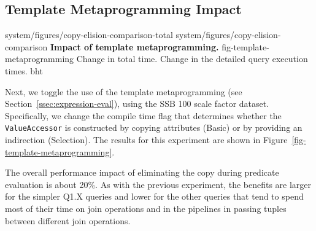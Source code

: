 


\subsection{Template Metaprogramming Impact}
\label{sec:expt:vectorization}

\twoabfigures
{system/figures/copy-elision-comparison-total}
{system/figures/copy-elision-comparison}
{\textbf{Impact of template metaprogramming.}}
{fig-template-metaprogramming}
{Change in total time.}
{Change in the detailed query execution times.}
{bht}

Next, we toggle the use of the template metaprogramming (see Section~\ref{ssec:expression-eval}), using the SSB 100 scale factor dataset. Specifically, we change the compile time flag that determines whether the \texttt{ValueAccessor} is constructed by copying attributes (Basic) or by providing an indirection (Selection). The results for this experiment are shown in Figure~\ref{fig-template-metaprogramming}.

The overall performance impact of eliminating the copy during predicate evaluation is about 20\%. As with the previous experiment, the benefits are larger for the simpler Q1.X queries and lower for the other queries that tend to spend most of their time on join operations and in the pipelines in passing tuples between different join operations.

